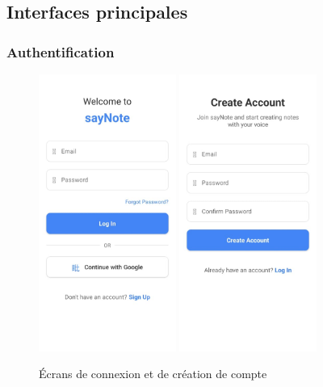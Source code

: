 \subsection{Interfaces principales}

\subsubsection{Authentification}
\begin{figure}[H]
    \centering
    \includegraphics[width=0.4\textwidth]{assets/docs/mobile/login-page.jpeg}
    \hfill
    \includegraphics[width=0.4\textwidth]{assets/docs/mobile/create-account-page.jpeg}
    \caption{Écrans de connexion et de création de compte}
    \label{fig:mobile-auth}
\end{figure}

